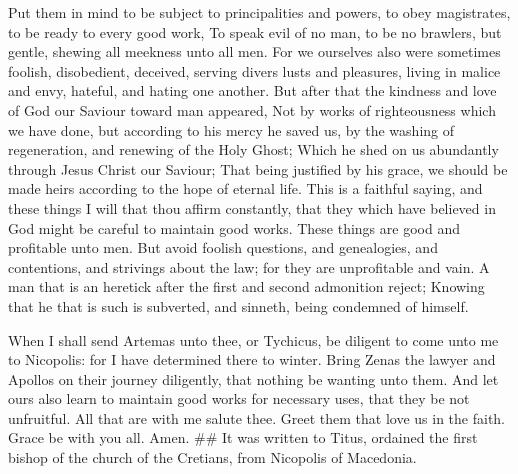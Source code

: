  Put them in mind to be subject to principalities and
powers, to obey magistrates, to be ready to every good work,
 To speak evil of no man, to be no brawlers, but gentle,
shewing all meekness unto all men.  For we ourselves also
were sometimes foolish, disobedient, deceived, serving divers lusts and
pleasures, living in malice and envy, hateful, and hating one another.
 But after that the kindness and love of God our Saviour
toward man appeared,  Not by works of righteousness which we
have done, but according to his mercy he saved us, by the washing of
regeneration, and renewing of the Holy Ghost;  Which he shed
on us abundantly through Jesus Christ our Saviour;  That
being justified by his grace, we should be made heirs according to the
hope of eternal life.  This is a faithful saying, and these
things I will that thou affirm constantly, that they which have believed
in God might be careful to maintain good works. These things are good
and profitable unto men.  But avoid foolish questions, and
genealogies, and contentions, and strivings about the law; for they are
unprofitable and vain.  A man that is an heretick after the
first and second admonition reject;  Knowing that he that
is such is subverted, and sinneth, being condemned of himself.

 When I shall send Artemas unto thee, or Tychicus, be
diligent to come unto me to Nicopolis: for I have determined there to
winter.  Bring Zenas the lawyer and Apollos on their
journey diligently, that nothing be wanting unto them.  And
let ours also learn to maintain good works for necessary uses, that they
be not unfruitful.  All that are with me salute thee. Greet
them that love us in the faith. Grace be with you all. Amen. \#\# It was
written to Titus, ordained the first bishop of the church of the
Cretians, from Nicopolis of Macedonia.
